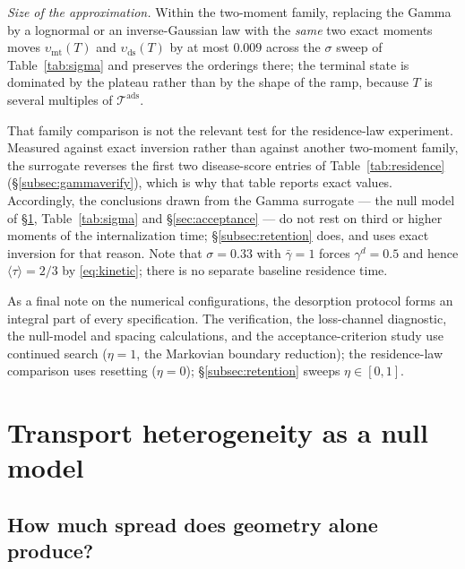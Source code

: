 \documentclass[pdflatex,sn-mathphys-num]{sn-jnl}
\numberwithin{equation}{section}
\theoremstyle{thmstyleone}%
\theoremstyle{definition}
\theoremstyle{remark}
\begin{document}
\emph{Size of the approximation.} Within the two-moment family, replacing the
Gamma by a lognormal or an inverse-Gaussian law with the \emph{same} two exact
moments moves $\upsilon_{\mathrm{mt}}(T)$ and $\upsilon_{\mathrm{ds}}(T)$ by at
most $0.009$ across the $\sigma$ sweep of Table~\ref{tab:sigma} and preserves
the orderings there; the terminal state is dominated by the plateau rather than
by the shape of the ramp, because $T$ is several multiples of
$\mathcal T^{\mathrm{ads}}$.

That family comparison is not the relevant test for the residence-law experiment. Measured against exact inversion rather than against another two-moment family, the surrogate reverses the first two disease-score entries of Table~\ref{tab:residence} (\S\ref{subsec:gammaverify}), which is why that table reports exact values. Accordingly, the conclusions drawn from the Gamma surrogate --- the null model of \S\ref{sec:null}, Table~\ref{tab:sigma} and \S\ref{sec:acceptance} --- do not rest on third or higher moments of the internalization time; \S\ref{subsec:retention} does, and uses exact inversion for that reason. Note that $\sigma=0.33$ with $\bar\gamma=1$ forces $\gamma^d=0.5$ and hence $\langle\tau\rangle=2/3$ by \eqref{eq:kinetic}; there is no separate baseline residence time.

As a final note on the numerical configurations, the desorption protocol forms an integral part of every specification. The verification, the loss-channel diagnostic, the null-model and spacing calculations, and the acceptance-criterion study use continued search ($\eta=1$, the Markovian boundary reduction); the residence-law comparison uses resetting ($\eta=0$); \S\ref{subsec:retention} sweeps $\eta\in[0,1]$. 

\section{Transport heterogeneity as a null model}
\label{sec:null}

\subsection{How much spread does geometry alone produce?}
\label{subsec:nullspread}
\end{document}
